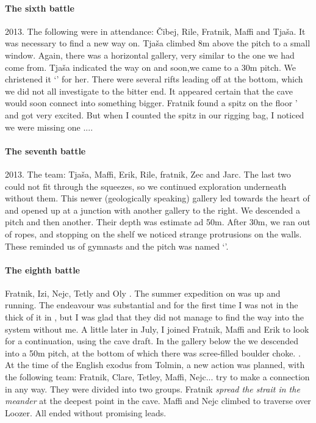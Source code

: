 \paragraph {The sixth battle} 2013. The following were in attendance: Čibej, Rile, Fratnik, Maffi and Tjaša. It was necessary to find a new way on. Tjaša climbed 8m above the  pitch to a small window. Again, there was a horizontal gallery, very similar to the one we had come from. Tjaša indicated the way on and soon,we came to a 30m pitch. We christened it `' for her. There were several rifts leading off at the bottom, which we did not all investigate to the bitter end. It appeared certain that the cave would soon connect into something bigger. Fratnik found a spitz on the floor ' and got very excited. But when I counted the spitz in our rigging bag, I noticed we were missing one ....

\paragraph{The seventh battle} 2013. The team: Tjaša, Maffi, Erik, Rile, fratnik, Zec and Jarc. The last two could not fit through the squeezes, so we continued exploration underneath  without them. This newer (geologically speaking) gallery led towards the heart of  and opened up at a junction with another gallery to the right. We descended a pitch and then another. Their depth was estimate ad 50m. After 30m, we ran out of ropes, and stopping on the shelf we noticed strange protrusions on the walls. These reminded us of gymnasts and the pitch was named `'.

\paragraph{The eighth battle} Fratnik, Izi, Nejc, Tetly and Oly . The summer expedition on  was up and running. The endeavour was substantial and for the first time I was not in the thick of it in , but I was glad that they did not manage to find the way into the system without me. A little later in July, I joined Fratnik, Maffi and Erik to look for a continuation, using the cave draft. In the gallery below the  we descended into a 50m pitch, at the bottom of which there was scree-filled boulder choke. . At the time of the English exodus from Tolmin, a new action was planned, with the following team: Fratnik, Clare, Tetley, Maffi, Nejc... try to make a connection in any way. They were divided into two groups. Fratnik \textit{spread the strait in the meander} at the deepest point in the cave. Maffi and Nejc climbed to traverse over Loozer. All ended without promising leads.

